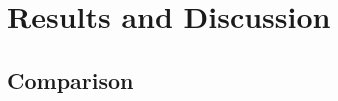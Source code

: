 
\section{Results and Discussion}
\label{section:resultsdiscussion}


\subsection{Comparison}
\label{subsection:comparison}

